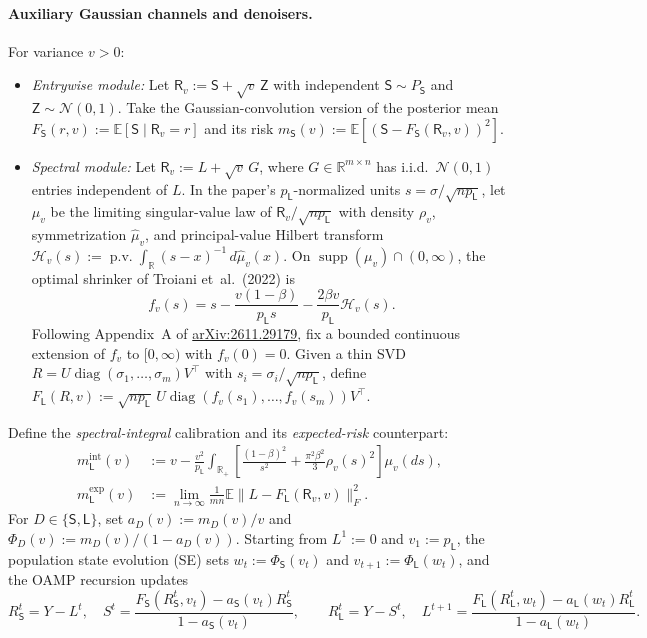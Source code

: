 \documentclass[11pt]{article}
\theoremstyle{plain}
\theoremstyle{definition}
\theoremstyle{remark}
\DeclareMathOperator{\diag}{diag}
\DeclareMathOperator{\supp}{supp}
\DeclareMathOperator{\pv}{p.v.}
\newcommand{\E}{\mathbb{E}}
\newcommand{\R}{\mathbb{R}}
\newcommand{\sL}{\mathsf{L}}
\newcommand{\sS}{\mathsf{S}}
\newcommand{\sR}{\mathsf{R}}
\newcommand{\sZ}{\mathsf{Z}}
\begin{document}
\paragraph{Auxiliary Gaussian channels and denoisers.}
For variance $v > 0$:
\begin{itemize}[leftmargin=2em,itemsep=2pt]
\item \emph{Entrywise module:} Let $\sR_v := \sS + \sqrt{v}\,\sZ$ with independent $\sS \sim P_{\sS}$ and $\sZ \sim \mathcal{N}(0,1)$. Take the Gaussian-convolution version of the posterior mean $F_{\sS}(r, v) := \E[\sS \mid \sR_v = r]$ and its risk $m_{\sS}(v) := \E[(\sS - F_{\sS}(\sR_v, v))^2]$.
\item \emph{Spectral module:} Let $\bm{\sR}_v := L + \sqrt{v}\,G$, where $G \in \R^{m\times n}$ has i.i.d.\ $\mathcal{N}(0,1)$ entries independent of $L$. In the paper's $p_{\sL}$-normalized units $s = \sigma/\sqrt{np_{\sL}}$, let $\mu_v$ be the limiting singular-value law of $\bm{\sR}_v/\sqrt{np_{\sL}}$ with density $\rho_v$, symmetrization $\widehat{\mu}_v$, and principal-value Hilbert transform $\mathcal{H}_v(s) := \pv\int_{\R}(s-x)^{-1}\,d\widehat{\mu}_v(x)$. On $\supp(\mu_v) \cap (0,\infty)$, the optimal shrinker of Troiani et~al.\ (2022) is
\begin{equation}\label{eq:shrinker}
f_v(s) = s - \frac{v(1-\beta)}{p_{\sL} s} - \frac{2\beta v}{p_{\sL}}\mathcal{H}_v(s).
\end{equation}
Following Appendix~A of \href{https://arxiv.org/abs/2611.29179}{arXiv:2611.29179}, fix a bounded continuous extension of $f_v$ to $[0,\infty)$ with $f_v(0) = 0$. Given a thin SVD $R = U\diag(\sigma_1,\dots,\sigma_m)V^\top$ with $s_i = \sigma_i/\sqrt{np_{\sL}}$, define $F_{\sL}(R, v) := \sqrt{np_{\sL}}\,U\diag(f_v(s_1),\dots,f_v(s_m))V^\top$.
\end{itemize}
Define the \emph{spectral-integral} calibration and its \emph{expected-risk} counterpart:
\begin{align}
m_{\sL}^{\mathrm{int}}(v)
&:= v - \frac{v^2}{p_{\sL}}\int_{\R_+}\!\left[\frac{(1-\beta)^2}{s^2}
  + \frac{\pi^2\beta^2}{3}\rho_v(s)^2\right]\mu_v(ds),\label{eq:mL-int}\\
m_{\sL}^{\mathrm{exp}}(v)
&:= \lim_{n\to\infty}\frac{1}{mn}\E\bigl\|L - F_{\sL}(\bm{\sR}_v, v)\bigr\|_F^2.\label{eq:mL-exp}
\end{align}
For $D \in \{\sS, \sL\}$, set $a_D(v) := m_D(v)/v$ and $\Phi_D(v) := m_D(v)/(1 - a_D(v))$. Starting from $L^1 := 0$ and $v_1 := p_{\sL}$, the population state evolution (SE) sets $w_t := \Phi_{\sS}(v_t)$ and $v_{t+1} := \Phi_{\sL}(w_t)$, and the OAMP recursion updates
\begin{equation}\label{eq:oamp}
R_{\sS}^t = Y - L^t,\quad
S^t = \frac{F_{\sS}(R_{\sS}^t, v_t) - a_{\sS}(v_t)R_{\sS}^t}{1 - a_{\sS}(v_t)},\qquad
R_{\sL}^t = Y - S^t,\quad
L^{t+1} = \frac{F_{\sL}(R_{\sL}^t, w_t) - a_{\sL}(w_t)R_{\sL}^t}{1 - a_{\sL}(w_t)}.
\end{equation}
\end{document}

